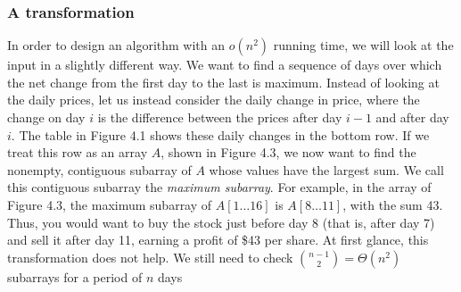 \documentclass{report}
\begin{document}
        \subsubsection{A transformation}
        \bigbreak \noindent 
        In order to design an algorithm with an \( o(n^2) \) running time, we will look at the input in a slightly different way. We want to find a sequence of days over which the net change from the first day to the last is maximum. Instead of looking at the daily prices, let us instead consider the daily change in price, where the change on day \( i \) is the difference between the prices after day \( i - 1 \) and after day \( i \). The table in Figure 4.1 shows these daily changes in the bottom row. If we treat this row as an array \( A \), shown in Figure 4.3, we now want to find the nonempty, contiguous subarray of \( A \) whose values have the largest sum. We call this contiguous subarray the \textit{maximum subarray}. For example, in the array of Figure 4.3, the maximum subarray of \( A[1 \ldots 16] \) is \( A[8 \ldots 11] \), with the sum 43. Thus, you would want to buy the stock just before day 8 (that is, after day 7) and sell it after day 11, earning a profit of \$43 per share.
        \bigbreak \noindent 
        \bigbreak \noindent 
        At first glance, this transformation does not help. We still need to check $\binom{n-1}{2} = \Theta(n^{2}) $ subarrays for a period of $n$ days
        \bigbreak \noindent 
\end{document}
